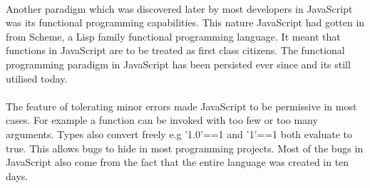 \paragraph{}
Another paradigm which was discovered later by most developers in JavaScript was its functional programming capabilities\cite{JS}. This nature JavaScript had gotten in from Scheme, a Lisp family functional programming language. It meant that functions in JavaScript are to be treated as first  class citizens. The functional programming paradigm in JavaScript has been persisted  ever since and its still utilised today\cite{JS}.
\paragraph{}
The feature of tolerating minor errors made JavaScript to be permissive in most cases. For example a function can be invoked with too few or too many arguments. Types also convert freely e.g '1.0'==1 and '1'==1 both evaluate to true\cite{Eich:2005:JTY:1090189.1086382}. This allows bugs to hide in most programming projects. Most of the bugs in JavaScript also come from the fact that the entire language was created in ten days.